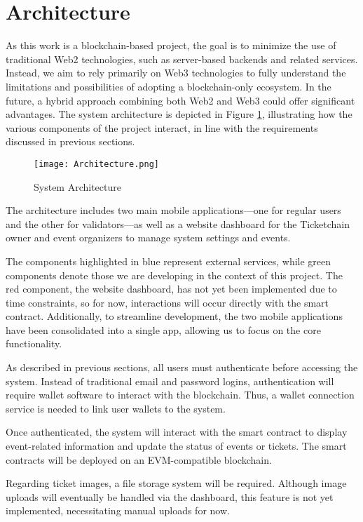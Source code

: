 \section{Architecture}
\label{sec:architecture}

As this work is a blockchain-based project, the goal is to minimize the use of
traditional Web2 technologies, such as server-based backends and related
services. Instead, we aim to rely primarily on Web3 technologies to fully
understand the limitations and possibilities of adopting a blockchain-only
ecosystem. In the future, a hybrid approach combining both Web2 and Web3 could
offer significant advantages. The system architecture is depicted in Figure
\ref{fig:architecture}, illustrating how the various components of the project
interact, in line with the requirements discussed in previous sections.

\begin{figure}[H]
    \centering
    \texttt{[image: Architecture.png]}
    \caption{System Architecture}
    \label{fig:architecture}
\end{figure}

The architecture includes two main mobile applications—one for regular users
and the other for validators—as well as a website dashboard for the Ticketchain
owner and event organizers to manage system settings and events.

The components highlighted in blue represent external services, while green
components denote those we are developing in the context of this project. The
red component, the website dashboard, has not yet been implemented due to time
constraints, so for now, interactions will occur directly with the smart
contract. Additionally, to streamline development, the two mobile applications
have been consolidated into a single app, allowing us to focus on the core
functionality.

As described in previous sections, all users must authenticate before accessing
the system. Instead of traditional email and password logins, authentication
will require wallet software to interact with the blockchain. Thus, a wallet
connection service is needed to link user wallets to the system.

Once authenticated, the system will interact with the smart contract to display
event-related information and update the status of events or tickets. The smart
contracts will be deployed on an EVM-compatible blockchain.

Regarding ticket images, a file storage system will be required. Although image
uploads will eventually be handled via the dashboard, this feature is not yet
implemented, necessitating manual uploads for now.
